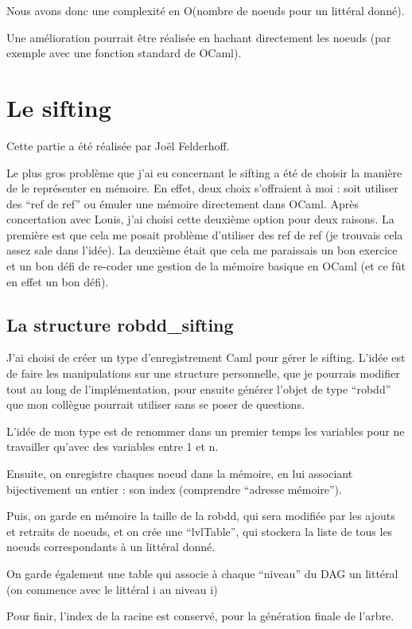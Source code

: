 \documentclass[a4paper,10pt]{article}
\begin{document}
Nous avons donc une complexité en O(nombre de noeuds pour un littéral donné).

Une amélioration pourrait être réalisée en hachant directement les noeuds (par exemple avec une fonction standard de OCaml).

\section{Le sifting}
Cette partie a été réalisée par Joël Felderhoff.

Le plus gros problème que j'ai eu concernant le sifting a été de choisir la manière de le représenter en mémoire.
En effet, deux choix s'offraient à moi : soit utiliser des ``ref de ref'' ou émuler une mémoire directement dans OCaml. Après concertation avec Louis, j'ai choisi
cette deuxième option pour deux raisons. La première est que cela me posait problème d'utiliser des ref de ref (je trouvais cela assez sale dans l'idée). La deuxième était que cela me
paraissais un bon exercice et un bon défi de re-coder une gestion de la mémoire basique en OCaml (et ce fût en effet un bon défi).

\subsection{La structure robdd\_sifting}
J'ai choisi de créer un type d'enregistrement Caml pour gérer le sifting. L'idée est de faire les manipulations sur une structure personnelle, que je pourrais modifier tout au long de 
l'implémentation, pour ensuite générer l'objet de type ``robdd'' que mon collègue pourrait utiliser sans se poser de questions.

L'idée de mon type est de renommer dans un premier temps les variables pour ne travailler qu'avec des variables entre 1 et n.

Ensuite, on enregistre chaques noeud dans la mémoire, en lui associant bijectivement un entier : son index (comprendre ``adresse mémoire''). 

Puis, on garde en mémoire la taille de la robdd, qui sera modifiée par les ajouts et retraits de noeuds, et on crée une ``lvlTable'', qui stockera la liste de tous les noeuds correspondants à un 
littéral donné.

On garde également une table qui associe à chaque ``niveau'' du DAG un littéral (on commence avec le littéral i au niveau i)

Pour finir, l'index de la racine est conservé, pour la génération finale de l'arbre.
\end{document}
